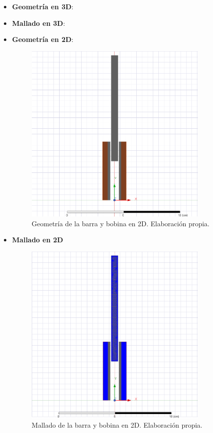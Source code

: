 \begin{itemize}
    \item \textbf{Geometría en 3D}:
    \item \textbf{Mallado en 3D}:
    \item \textbf{Geometría en 2D}:
    \begin{figure}[H]
        \centering
        \includegraphics[width=9cm]{FigurasMemoria/BarGeom.png}
        \caption{Geometría de la barra y bobina en 2D. Elaboración propia.}
        \label{fig:BarGeom} %
    \end{figure}
    \item \textbf{Mallado en 2D}
    \begin{figure}[H]
        \centering
        \includegraphics[width=9cm]{FigurasMemoria/BarGeomMesh.png}
        \caption{Mallado de la barra y bobina en 2D. Elaboración propia.}

\end{figure}
\end{itemize}
